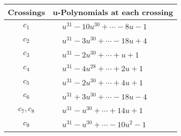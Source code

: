 \documentclass[1p]{elsarticle_modified}
\theoremstyle{definition}
\begin{document}
\begin{tabular}{m{50pt}|m{274pt}}
Crossings & \hspace{64pt}u-Polynomials at each crossing \\
\hline $$\begin{aligned}c_{1}\end{aligned}$$&$\begin{aligned}
&u^{31}-10 u^{30}+\cdots-8 u-1
\end{aligned}$\\
\hline $$\begin{aligned}c_{2}\end{aligned}$$&$\begin{aligned}
&u^{31}-3 u^{30}+\cdots-18 u+4
\end{aligned}$\\
\hline $$\begin{aligned}c_{3}\end{aligned}$$&$\begin{aligned}
&u^{31}-2 u^{30}+\cdots+u+1
\end{aligned}$\\
\hline $$\begin{aligned}c_{4}\end{aligned}$$&$\begin{aligned}
&u^{31}-4 u^{28}+\cdots+2 u+1
\end{aligned}$\\
\hline $$\begin{aligned}c_{5}\end{aligned}$$&$\begin{aligned}
&u^{31}-2 u^{30}+\cdots+4 u+1
\end{aligned}$\\
\hline $$\begin{aligned}c_{6}\end{aligned}$$&$\begin{aligned}
&u^{31}+3 u^{30}+\cdots-18 u-4
\end{aligned}$\\
\hline $$\begin{aligned}c_{7},c_{8}\end{aligned}$$&$\begin{aligned}
&u^{31}- u^{30}+\cdots+14 u+1
\end{aligned}$\\
\hline $$\begin{aligned}c_{9}\end{aligned}$$&$\begin{aligned}
&u^{31}- u^{30}+\cdots-10 u^2-1
\end{aligned}$\\

\end{tabular}
\end{document}
